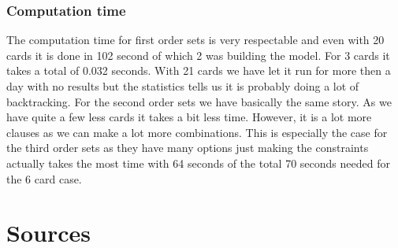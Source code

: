 \documentclass[12pt]{scrartcl}
\begin{document}
\subsubsection{Computation time}

The computation time for first order sets is very respectable and even with 20 cards it is done in 102 second of which 2 was building the model. For 3 cards it takes a total of 0.032 seconds. With 21 cards we have let it run for more then a day with no results but the statistics tells us it is probably doing a lot of backtracking. For the second order sets we have basically the same story. As we have quite a few less cards it takes a bit less time. However, it is a lot more clauses as we can make a lot more combinations. This is especially the case for the third order sets as they have many options just making the constraints actually takes the most time with 64 seconds of the total 70 seconds needed for the 6 card case.

\section{Sources}

\printbibliography
\end{document}
